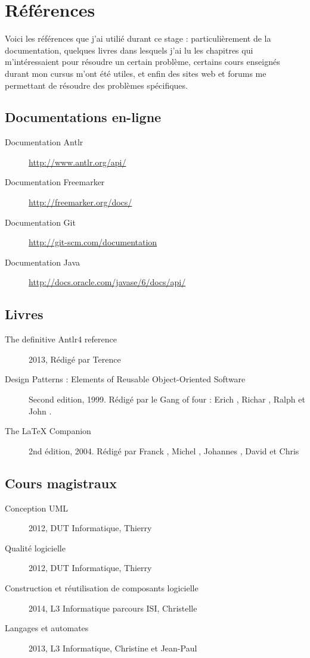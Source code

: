 \chapter{Références}
Voici les références que j'ai utilié durant ce stage : particulièrement de la documentation, quelques livres dans lesquels j'ai lu les chapitres qui m'intéressaient pour résoudre un certain problème, certains cours enseignés durant mon cursus m'ont été utiles, et enfin des sites web et forums me permettant de résoudre des problèmes spécifiques.

\section{Documentations en-ligne}
\begin{description}
	\item[Documentation Antlr] \url{http://www.antlr.org/api/}
	\item[Documentation Freemarker] \url{http://freemarker.org/docs/}
	\item[Documentation Git] \url{http://git-scm.com/documentation}	
	\item[Documentation Java] \url{http://docs.oracle.com/javase/6/docs/api/}
\end{description}

\section{Livres}
	\begin{description}
	\item[The definitive Antlr4 reference] 2013, Rédigé par Terence 
	\item[Design Patterns : Elements of Reusable Object-Oriented Software] Second edition, 1999. Rédigé par le Gang of four : Erich , Richar , Ralph  et John .	
	\item[The \LaTeX{} Companion] 2nd édition, 2004. Rédigé par Franck , Michel , Johannes , David  et Chris  
\end{description}
\section{Cours magistraux}
\begin{description}
	\item[Conception UML] 2012, DUT Informatique, Thierry 
	\item[Qualité logicielle] 2012, DUT Informatique, Thierry 
	\item[Construction et réutilisation de composants logicielle] 2014, L3 Informatique parcours ISI, Christelle 
	\item[Langages et automates] 2013, L3 Informatique, Christine  et Jean-Paul 
\end{description}
\newpage
